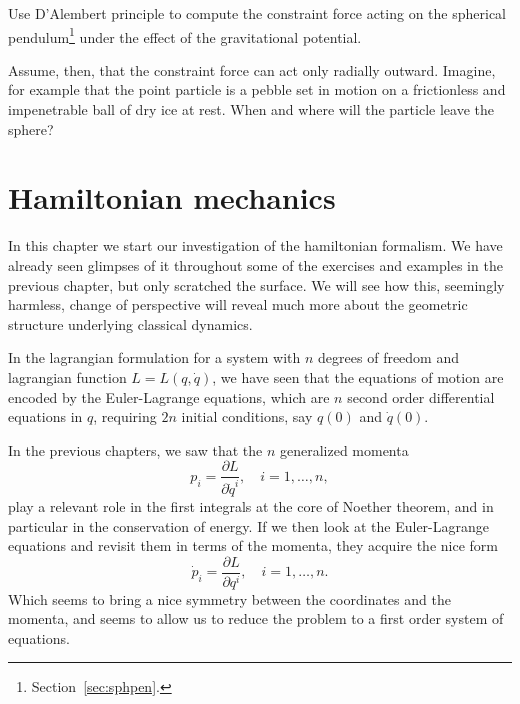 \documentclass[english,fontsize=11pt,paper=a5,oneside]{scrbook}
\theoremstyle{definition}
\newenvironment{exercise}
  {\pushQED{\qed}\renewcommand{\qedsymbol}{$\maltese$}\exercisex}
  {\popQED\endexercisex}
\begin{document}
\begin{exercise}
  Use D'Alembert principle to compute the constraint force acting on the spherical pendulum\footnote{Section~\ref{sec:sphpen}.} under the effect of the gravitational potential.

  Assume, then, that the constraint force can act only radially outward. Imagine, for example that the point particle is a pebble set in motion on a frictionless and impenetrable ball of dry ice at rest.
  When and where will the particle leave the sphere?
\end{exercise}


\chapter{Hamiltonian mechanics}

In this chapter we start our investigation of the hamiltonian formalism.
We have already seen glimpses of it throughout some of the exercises and examples in the previous chapter, but only scratched the surface.
We will see how this, seemingly harmless, change of perspective will reveal much more about the geometric structure underlying classical dynamics.

In the lagrangian formulation for a system with $n$ degrees of freedom and lagrangian function $L=L(q, \dot q)$, we have seen that the equations of motion are encoded by the Euler-Lagrange equations, which are $n$ second order differential equations in $q$, requiring $2n$ initial conditions, say $q(0)$ and $\dot q(0)$.

In the previous chapters, we saw that the $n$ generalized momenta
\begin{equation}
  p_i = \frac{\partial L}{\partial \dot q^i}, \quad i=1,\ldots,n,
\end{equation}
play a relevant role in the first integrals at the core of Noether theorem, and in particular in the conservation of energy.
If we then look at the Euler-Lagrange equations and revisit them in terms of the momenta, they acquire the nice form
\begin{equation}
  \dot p_i = \frac{\partial L}{\partial q^i}, \quad i=1,\ldots,n.
\end{equation}
Which seems to bring a nice symmetry between the coordinates and the momenta, and seems to allow us to reduce the problem to a first order system of equations.
\end{document}
